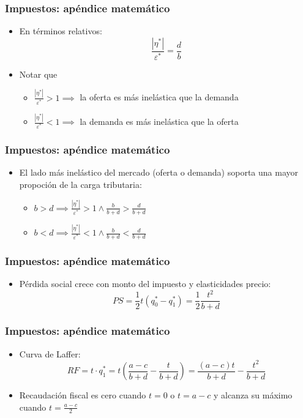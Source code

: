 \documentclass[dvipsnames,table,leqno]{beamer}
\newcommand{\peq}[1]{{\scriptscriptstyle{#1}}}
\newcommand{\rp}[1]{\left(#1\right)}
\begin{document}
		\begin{frame}
			\frametitle{Impuestos: apéndice matemático}
			\begin{itemize}
				\item En términos relativos: $$\frac{\left|\eta^\peq{*}\right|}{\varepsilon^\peq{*}}=\frac{d}{b}$$
				\item Notar que 
					\begin{itemize}
						\item $\frac{\left|\eta^\peq{*}\right|}{\varepsilon^\peq{*}}>1\implies$ la oferta es más inelástica que la demanda
						\item $\frac{\left|\eta^\peq{*}\right|}{\varepsilon^\peq{*}}<1\implies$ la demanda es más inelástica que la oferta
					\end{itemize}
			\end{itemize}
		\end{frame}

		\begin{frame}
			\frametitle{Impuestos: apéndice matemático}
				\begin{itemize}
					\item El lado más inelástico del mercado (oferta o demanda) soporta una mayor propoción de la carga tributaria:
						\begin{itemize}
							\item $b>d \implies\frac{\left|\eta^\peq{*}\right|}{\varepsilon^\peq{*}}>1\wedge\frac{b}{b+d}>\frac{d}{b+d}$
							\item $b<d \implies\frac{\left|\eta^\peq{*}\right|}{\varepsilon^\peq{*}}<1\wedge\frac{b}{b+d}<\frac{d}{b+d}$
						\end{itemize}
				\end{itemize}
		\end{frame}

		\begin{frame}
			\frametitle{Impuestos: apéndice matemático}
				\begin{itemize}
					\item Pérdida social crece con monto del impuesto y elasticidades precio: $$PS=\frac{1}{2}t\rp{q^\peq{*}_\peq{0}-q^\peq{*}_\peq{1}}=\frac{1}{2}\frac{t^2}{b+d}$$
				\end{itemize}
		\end{frame}

		\begin{frame}
			\frametitle{Impuestos: apéndice matemático}
				\begin{itemize}
					\item Curva de Laffer: $$RF=t\cdot q^\peq{*}_\peq{1}=t\rp{\frac{a-c}{b+d}-\frac{t}{b+d}}=\frac{\rp{a-c}t}{b+d}-\frac{t^2}{b+d}$$
					\item Recaudación fiscal es cero cuando $t=0$ o $t=a-c$ y alcanza su máximo cuando $t=\frac{a-c}{2}$
				\end{itemize}
		\end{frame}
\end{document}
